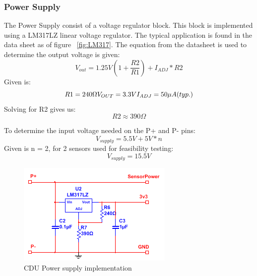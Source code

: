 \subsubsection{Power Supply}
The Power Supply consist of a voltage regulator block. This block is implemented using a LM317LZ linear voltage regulator. The typical application is found in the data sheet as of figure ~\ref{fig:LM317}. The equation from the datasheet is used to determine the output voltage is given:\\
\begin{equation}
	V_{out}=1.25V\left(1+\frac{R2}{R1}\right)+ I_{ADJ}*R2
\end{equation}
Given is:
\begin{equation}
	R1 = 240\Omega $\\$
	V_{OUT}=3.3V	$\\$
	I_{ADJ}=50 \mu A(typ.)
\end{equation}
Solving for R2 gives us:
\begin{equation}
	R2 \approx 390\Omega
\end{equation}

To determine the input voltage needed on the P+ and P- pins:\\
\begin{equation}
	V_{supply}=5.5V + 5V * n
\end{equation}
Given is n = 2, for 2 sensors used for feasibility testing:
\begin{equation}
	V_{supply}=15.5V
\end{equation}
\begin{figure}[H]
	\centering
	\includegraphics[scale=0.8]{billeder/impps}
	\caption{CDU Power supply implementation}
	\label{fig:CDUimpps}
\end{figure}

